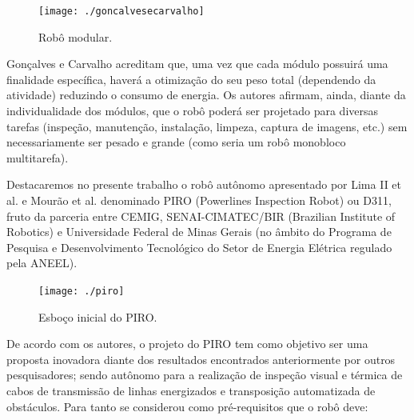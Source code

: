 \begin{figure} [h!]	
	\caption{Robô modular.}
	\label{img:goncalvesecarvalho}											 
	\centering													 
	\texttt{[image: ./goncalvesecarvalho]}
\end{figure}													 

Gonçalves e Carvalho \cite{gonccalves2013review} acreditam que, uma vez que cada módulo possuirá uma finalidade específica, haverá a otimização do seu peso total (dependendo da atividade) reduzindo o consumo de energia. Os autores afirmam, ainda, diante da individualidade dos módulos, que o robô poderá ser projetado para diversas tarefas (inspeção, manutenção, instalação, limpeza, captura de imagens, etc.) sem necessariamente ser pesado e grande (como seria um robô monobloco multitarefa). 


Destacaremos no presente trabalho o robô autônomo apresentado por Lima II et al. \cite{iirobo} e Mourão et al. \cite{mourao2015robolinhas} denominado PIRO (Powerlines Inspection Robot) ou D311, fruto da parceria entre CEMIG, SENAI-CIMATEC/BIR (Brazilian Institute of Robotics) e Universidade Federal de Minas Gerais (no âmbito do Programa de Pesquisa e Desenvolvimento Tecnológico do Setor de Energia Elétrica regulado pela ANEEL). 

\begin{figure} [h!]	
	\caption{Esboço inicial do PIRO.}
	\label{img:piro}											 
	\centering													 
	\texttt{[image: ./piro]}
\end{figure}													 

De acordo com os autores, o projeto do PIRO tem como objetivo ser uma proposta inovadora diante dos resultados encontrados anteriormente por outros pesquisadores; sendo autônomo para a realização de inspeção visual e térmica de cabos de transmissão de linhas energizados e transposição automatizada de obstáculos. Para tanto se considerou como pré-requisitos que o robô deve:


